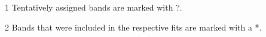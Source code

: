 \begin{table}[!htb]
\begin{threeparttable}
 \begin{tablenotes}
     \item[1] Tentatively assigned bands are marked with ?.\\
     \item[2] Bands that were included in the respective fits are marked with a *.\\
 \end{tablenotes}

 \end{threeparttable}
     
\end{table}
